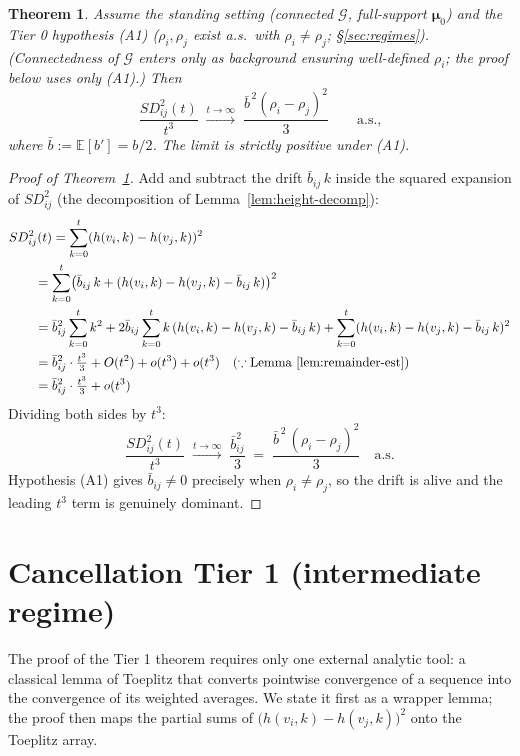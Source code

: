 \documentclass[11pt]{article}
\newtheorem{thm}{Theorem}
\theoremstyle{definition}
\begin{document}
\begin{thm}
\label{thm:drift}
Assume the standing setting (connected $\mathcal{G}$, full-support $\boldsymbol{\mu}_0$) and the Tier 0 hypothesis (A1) ($\rho_i, \rho_j$ exist a.s.\ with $\rho_i \neq \rho_j$; \S\ref{sec:regimes}). (Connectedness of $\mathcal{G}$ enters only as background ensuring well-defined $\rho_i$; the proof below uses only (A1).)
Then
\[
  \frac{SD^2_{ij}(t)}{t^3} \;\xrightarrow{t \to \infty}\; \frac{\bar{b}^{\,2}(\rho_i - \rho_j)^2}{3} \qquad \text{a.s.,}
\]
where $\bar{b} := \mathbb{E}[b'] = b/2$. The limit is strictly positive under (A1).
\end{thm}

\begin{proof}[Proof of Theorem~\ref{thm:drift}]
Add and subtract the drift $\bar{b}_{ij}\,k$ inside the squared expansion of $SD^2_{ij}$ (the decomposition of Lemma~\ref{lem:height-decomp}):
\begin{align*}
\MoveEqLeft[2] SD^2_{ij}(t)
= \sum_{k=0}^{t} (h(v_i,k) - h(v_j,k))^2 \\
&= \sum_{k=0}^{t} \bigl(\bar{b}_{ij}\,k + (h(v_i,k) - h(v_j,k) - \bar{b}_{ij}\,k)\bigr)^2 \\
&= \bar{b}_{ij}^2 \sum_{k=0}^{t} k^2 + 2\bar{b}_{ij}\sum_{k=0}^{t} k\,(h(v_i,k) - h(v_j,k) - \bar{b}_{ij}\,k) + \sum_{k=0}^{t} (h(v_i,k) - h(v_j,k) - \bar{b}_{ij}\,k)^2 \\
&= \bar{b}_{ij}^2 \cdot \tfrac{t^3}{3} + O(t^2) + o(t^3) + o(t^3)
   \quad (\because \text{Lemma~\ref{lem:remainder-est}}) \\
&= \bar{b}_{ij}^2 \cdot \tfrac{t^3}{3} + o(t^3)
\end{align*}
Dividing both sides by $t^3$:
\[
\frac{SD^2_{ij}(t)}{t^3}
\;\xrightarrow{t \to \infty}\;
\frac{\bar{b}_{ij}^2}{3}
\;=\; \frac{\bar b^{\,2}\,(\rho_i - \rho_j)^2}{3} \quad \text{a.s.}
\]
Hypothesis (A1) gives $\bar{b}_{ij} \neq 0$ precisely when $\rho_i \neq \rho_j$, so the drift is alive and the leading $t^3$ term is genuinely dominant.
\end{proof}






\section{Cancellation Tier 1 (intermediate regime)}

The proof of the Tier 1 theorem requires only one external analytic tool: a classical lemma of Toeplitz that converts pointwise convergence of a sequence into the convergence of its weighted averages. We state it first as a wrapper lemma; the proof then maps the partial sums of $\bigl(h(v_i,k)-h(v_j,k)\bigr)^2$ onto the Toeplitz array.
\end{document}
